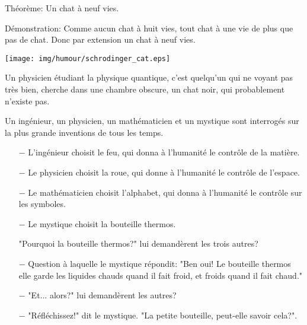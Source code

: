 	\begin{center}\underline{\hspace{5 cm}}\end{center}	

	Théorème: Un chat à neuf vies.

	Démonstration: Comme aucun chat à huit vies, tout chat à une vie de plus que pas de chat. Donc par extension un chat à neuf vies.
	
	\begin{center}\underline{\hspace{5 cm}}\end{center}

	\begin{center}
	\texttt{[image: img/humour/schrodinger\_cat.eps]}
	\end{center}
	
	\begin{center}\underline{\hspace{5 cm}}\end{center}

	Un physicien étudiant la physique quantique, c'est quelqu'un qui ne voyant pas très bien, cherche dans une chambre obscure, un chat noir, qui probablement n'existe pas.
	
	\begin{center}\underline{\hspace{5 cm}}\end{center}

	Un ingénieur, un physicien, un mathématicien et un mystique sont interrogés sur la plus grande inventions de tous les temps.

\begin{itemize}	 
	\item[$-$]  L'ingénieur choisit le feu, qui donna à l'humanité le contrôle de la matière.

	\item[$-$] Le physicien choisit la roue, qui donne à l'humanité le contrôle de l'espace.

	\item[$-$] Le mathématicien choisit l'alphabet, qui donna à l'humanité le contrôle sur les symboles.

	\item[$-$] Le mystique choisit la bouteille thermos.

"Pourquoi la bouteille thermos?" lui demandèrent les trois autres?

	\item[$-$] Question à laquelle le mystique répondit: "Ben oui! Le bouteille thermos elle garde les liquides chauds quand il fait froid, et froids quand il fait chaud."

	\item[$-$] "Et... alors?" lui demandèrent les autres?

	\item[$-$] "Réfléchissez!" dit le mystique. "La petite bouteille, peut-elle savoir cela?".
	\end{itemize}
	
